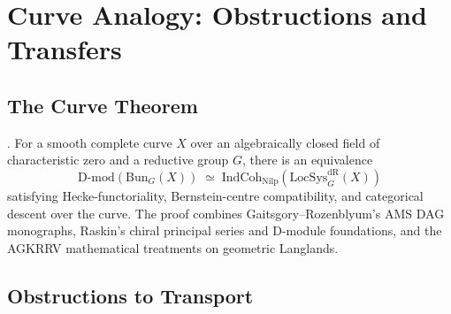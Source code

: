 \section{Curve Analogy: Obstructions and Transfers}
\label{v4-arith:acd:function-field-transport}

\subsection{The Curve Theorem}

\begin{theorem}
\label{v4-arith:acd:thm:FF-geom-langlands}
\ClaimStatusProvedElsewhere. For a smooth complete curve \(X\) over an
algebraically closed field of characteristic zero and a reductive group
\(G\),
there is an equivalence
\begin{equation}
\mathrm{D}\text{-}\mathrm{mod}(\mathrm{Bun}_{G}(X))\;\simeq\;\mathrm{IndCoh}_{\mathrm{Nilp}}(\mathrm{LocSys}^{\mathrm{dR}}_{G}(X))
\end{equation}
satisfying Hecke-functoriality, Bernstein-centre compatibility, and
categorical descent over the curve. The proof combines
Gaitsgory--Rozenblyum's AMS DAG monographs, Raskin's chiral principal
series and D-module foundations, and the AGKRRV mathematical treatments on geometric
Langlands.
\end{theorem}

\subsection{Obstructions to Transport}

